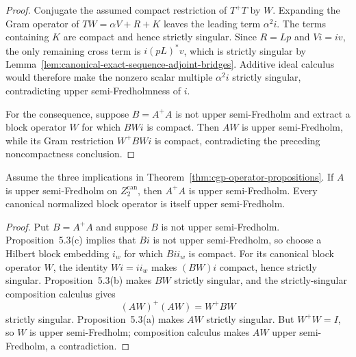 \begin{proof}
Conjugate the assumed compact restriction of $T^+T$ by $W$.  Expanding the Gram operator of
$TW=\alpha V+R+K$ leaves the leading term $\alpha^2 i$.  The terms containing $K$ are compact
and hence strictly singular.  Since $R=Lp$ and $Vi=iv$, the only remaining cross term is
$i(pL)^*v$, which is strictly singular by
Lemma~\ref{lem:canonical-exact-sequence-adjoint-bridges}.  Additive ideal calculus would therefore
make the nonzero scalar multiple $\alpha^2 i$ strictly singular, contradicting upper
semi-Fredholmness of $i$.

For the consequence, suppose $B=A^+A$ is not upper semi-Fredholm and extract a block operator
$W$ for which $BWi$ is compact.  Then $AW$ is upper semi-Fredholm, while its Gram restriction
$W^+BWi$ is compact, contradicting the preceding noncompactness conclusion.
\end{proof}

\begin{lemma}\label{lem:cgp-primary-reduction}
Assume the three implications in Theorem~\ref{thm:cgp-operator-propositions}.  If $A$ is upper
semi-Fredholm on $Z_2^{\mathrm{can}}$, then $A^+A$ is upper semi-Fredholm.  Every canonical
normalized block operator is itself upper semi-Fredholm.
\leanok
\end{lemma}

\begin{proof}
Put $B=A^+A$ and suppose $B$ is not upper semi-Fredholm.  Proposition~5.3(c) implies that $Bi$
is not upper semi-Fredholm, so choose a Hilbert block embedding $i_w$ for which $Bii_w$ is
compact.  For its canonical block operator $W$, the identity $Wi=ii_w$ makes $(BW)i$ compact,
hence strictly singular.  Proposition~5.3(b) makes $BW$ strictly singular, and the
strictly-singular composition calculus gives
\[
  (AW)^+(AW)=W^+BW
\]
strictly singular.  Proposition~5.3(a) makes $AW$ strictly singular.  But $W^+W=I$, so $W$ is
upper semi-Fredholm; composition calculus makes $AW$ upper semi-Fredholm, a contradiction.
\end{proof}


